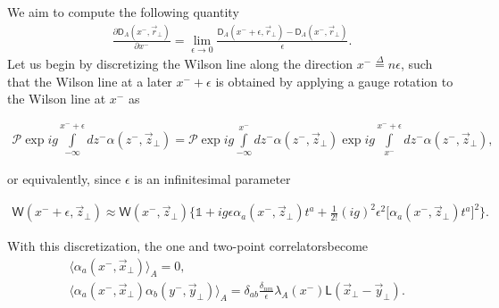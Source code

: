 \begin{note}
    We aim to compute the following quantity 
    \begin{align}\label{glasma44}
        \frac{\partial\textsf{D}_A(x^-,\vec{r}_\perp)}{\partial x^-}=\lim_{\epsilon\rightarrow 0}\frac{\textsf{D}_A(x^-+\epsilon,\vec{r}_\perp)-\textsf{D}_A(x^-,\vec{r}_\perp)}{\epsilon}.
    \end{align}
    Let us begin by discretizing the Wilson line along the direction $x^-\overset{\Delta}{=}n\epsilon$, such that the Wilson line at a later $x^-+\epsilon$ is obtained by applying a gauge rotation to the Wilson line at $x^-$ as
    \begin{fullwidth}
    \begin{align*}
        \mathcal{P}\exp{ig\int\limits_{-\infty}^{x^-+\epsilon}dz^-\alpha(z^-,\vec{z}_\perp)}=\mathcal{P}\exp{ig\int\limits_{-\infty}^{x^-}dz^-\alpha(z^-,\vec{z}_\perp)}\exp{ig\int\limits_{x^-}^{x^-+\epsilon}dz^-\alpha(z^-,\vec{z}_\perp)},
    \end{align*}
    \end{fullwidth}
    or equivalently, since $\epsilon$ is an infinitesimal parameter
    \begin{fullwidth}
    \begin{equation}\label{glasma42}
        \begin{aligned}
        \textsf{W}(x^-+\epsilon,\vec{z}_\perp)\approx\textsf{W}(x^-,\vec{z}_\perp)\Big\{\mathds{1}+ig\epsilon\alpha_a(x^-,\vec{z}_\perp)t^a+\frac{1}{2!}(ig)^2\epsilon^2\big[\alpha_a(x^-,\vec{z}_\perp)t^a\big]^2\Big\}.
    \end{aligned}
    \end{equation}
    \end{fullwidth}
    With this discretization, the one and two-point correlatorsbecome
    \vspace*{-0.5\baselineskip}
    \begin{subequations}
    \begin{align}
        &\langle \alpha_a\left(x^-,\vec{x}_\perp\right)\rangle_A=0,\label{glasma43a}\\
        &\langle \alpha_a\left(x^-,\vec{x}_\perp\right)\alpha_b\left(y^-,\vec{y}_\perp\right)\rangle_A=\delta_{ab}\frac{\delta_{nm}}{\epsilon}\lambda_A(x^-)\textsf{L}(\vec{x}_\perp-\vec{y}_\perp).\label{glasma43b}

\end{align}
\end{subequations}
\end{note}
